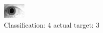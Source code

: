 \begin{figure}[h!]
\begin{center}
\includegraphics[width=0.60\columnwidth]{figures/ID1878_class_4_target_3.png}
\end{center}
\caption{ Classification: 4 actual target: 3}
\label{fig:ID1878_class_4_target_3}
\end{figure}
